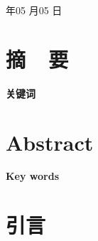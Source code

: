 \documentclass[openany,AutoFakeBold]{book}
\theoremstyle{definition}
\begin{document}
\begin{center}
{\hei{}\hspace{1.8mm} 年\hspace{1.8mm}05\hspace{1.8mm} 月\hspace{1.8mm}05\hspace{1.8mm} 日}
\end{center}


\pagestyle{empty} %

\frontmatter

\chapter{摘\ \ 要}
\renewcommand{\thepage}{\Roman{page}} %

\xiaosihao\song


\vspace{1.5cm}
\begin{center}
    {\bfseries\xiaosihao 关键词}

\end{center}

\chapter{\bfseries Abstract}




\vspace{1.5cm}
\begin{center}
{\bfseries\xiaoerhao Key words}

\end{center}



\newpage  %
\thispagestyle{empty}


\newpage
\makeatletter
\renewcommand*\l@chapter{\@dottedtocline{0}{0em}{3.5em}}
\makeatother

\tableofcontents   %

\mainmatter  %
\chapter{引言}  %
\pagestyle{fancy}
\renewcommand{\thepage}{\arabic{page}} %

\setcounter{page}{1}  %
\end{document}
